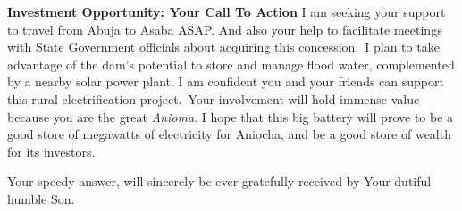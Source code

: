 \begin{fullwidth}
\textbf{Investment Opportunity: Your Call To Action}
\vspace{0.4cm}
I am seeking your support to travel from Abuja to Asaba ASAP. And also your help to facilitate meetings with State
Government officials about acquiring this concession.\ I plan to take advantage of the dam’s potential to store and
manage flood water, complemented by a nearby solar power plant.
\vspace{0.4cm}
I am confident you and your friends can support this rural electrification project.\ Your involvement will hold immense
value because you are the great \textit{Anioma}.
\vspace{0.4cm}
I hope that this big battery will prove to be a good store of megawatts of electricity for Aniocha, and be a good store of
wealth for its investors.
\vspace{0.4cm}

Your speedy answer, will sincerely be ever gratefully received by
\vspace{0.4cm}
Your dutiful humble Son.

\end{fullwidth}
\linenumbers